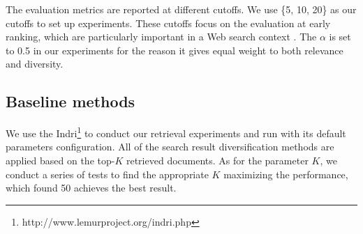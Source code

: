\documentclass[review]{elsarticle}
\newcommand\revised[1]{{\color{black} #1}}
\begin{document}
\revised{
	The evaluation metrics are reported at different cutoffs. We use \{5, 10, 20\} as our cutoffs to set up experiments. These cutoffs focus on the evaluation at early ranking, which are particularly important in a Web search context \cite{jansen1998real}. The $\alpha$ is set to 0.5 in our experiments for the reason it gives equal weight to both relevance and diversity.
	}

\subsection{Baseline methods}\label{baseline_setting}

\revised{
We use the Indri\footnote{http://www.lemurproject.org/indri.php} to conduct our retrieval experiments and run with its default parameters configuration. %
All of the search result diversification methods are applied based on the top-$ K $ retrieved documents. As for the parameter $K$, we conduct a series of tests to find the appropriate $K$ maximizing the performance, which found 50 achieves the best result.}
\end{document}
